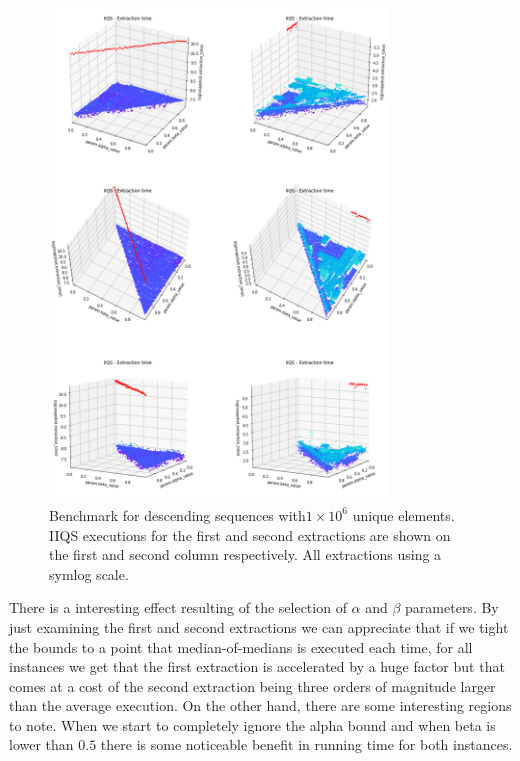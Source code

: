 \begin{figure}[!ht]
    \centering
    \includegraphics[width=0.8\textwidth]{./fragments/04_experimental_execution/images/04_alphabeta_singleclass_desc.png}
    \caption{Benchmark for descending sequences with$1\times10^6$ unique elements. IIQS executions for the first and second extractions are shown on the first and second column respectively. All extractions using a symlog scale.}
    \label{FIG:05_ALPHABETA_RELATIONSHIP_DESC}
\end{figure}


There is a interesting effect resulting of the selection of $\alpha$ and $\beta$ parameters. By just examining the first and second extractions we can appreciate that if we tight the bounds to a point that median-of-medians is executed each time, for all instances we get that the first extraction is accelerated by a huge factor but that comes at a cost of the second extraction being three orders of magnitude larger than the average execution. On the other hand, there are some interesting regions to note. When we start to completely ignore the alpha bound and when beta is lower than $0.5$ there is some noticeable benefit in running time for both instances.

